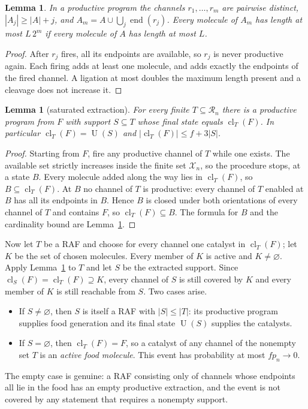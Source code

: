\documentclass[11pt,a4paper]{article}
\theoremstyle{plain}
\newtheorem{lemma}[theorem]{Lemma}
\theoremstyle{definition}
\theoremstyle{remark}
\newcommand{\cl}{\operatorname{cl}}
\newcommand{\cR}{\mathcal R}
\newcommand{\cX}{\mathcal X}
\newcommand{\eend}{\operatorname{end}}
\newcommand{\Uni}{\operatorname{U}}
\begin{document}
\begin{lemma}\label{lem:program-basic}
In a productive program the channels $r_1,\dots,r_m$ are pairwise distinct, $|A_j|\ge|A|+j$, and $A_m=A\cup\bigcup_j\eend(r_j)$. Every molecule of $A_m$ has length at most $L\,2^m$ if every molecule of $A$ has length at most $L$.
\end{lemma}

\begin{proof}
After $r_j$ fires, all its endpoints are available, so $r_j$ is never productive again. Each firing adds at least one molecule, and adds exactly the endpoints of the fired channel. A ligation at most doubles the maximum length present and a cleavage does not increase it.
\end{proof}

\begin{lemma}[saturated extraction]\label{lem:saturated}
For every finite $T\subseteq\cR_n$ there is a productive program from $F$ with support $S\subseteq T$ whose final state equals $\cl_T(F)$. In particular $\cl_T(F)=\Uni(S)$ and $|\cl_T(F)|\le f+3|S|$.
\end{lemma}

\begin{proof}
Starting from $F$, fire any productive channel of $T$ while one exists. The available set strictly increases inside the finite set $\cX_n$, so the procedure stops, at a state $B$. Every molecule added along the way lies in $\cl_T(F)$, so $B\subseteq\cl_T(F)$. At $B$ no channel of $T$ is productive: every channel of $T$ enabled at $B$ has all its endpoints in $B$. Hence $B$ is closed under both orientations of every channel of $T$ and contains $F$, so $\cl_T(F)\subseteq B$. The formula for $B$ and the cardinality bound are Lemma~\ref{lem:program-basic}.
\end{proof}

Now let $T$ be a RAF and choose for every channel one catalyst in $\cl_T(F)$; let $K$ be the set of chosen molecules. Every member of $K$ is active and $K\ne\varnothing$. Apply Lemma~\ref{lem:saturated} to $T$ and let $S$ be the extracted support. Since $\cl_S(F)=\cl_T(F)\supseteq K$, every channel of $S$ is still covered by $K$ and every member of $K$ is still reachable from $S$. Two cases arise.
\begin{itemize}
\item If $S\ne\varnothing$, then $S$ is itself a RAF with $|S|\le|T|$: its productive program supplies food generation and its final state $\Uni(S)$ supplies the catalysts.
\item If $S=\varnothing$, then $\cl_T(F)=F$, so a catalyst of any channel of the nonempty set $T$ is an \emph{active food molecule}. This event has probability at most $fp_n\to0$.
\end{itemize}
The empty case is genuine: a RAF consisting only of channels whose endpoints all lie in the food has an empty productive extraction, and the event is not covered by any statement that requires a nonempty support.
\end{document}
